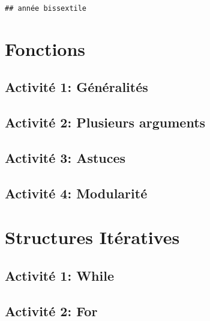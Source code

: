 \documentclass[
]{book}
\begin{document}
\begin{verbatim}
## année bissextile
\end{verbatim}

\hypertarget{fonctions}{%
\chapter{Fonctions}\label{fonctions}}

\hypertarget{activituxe9-1-guxe9nuxe9ralituxe9s}{%
\section{Activité 1: Généralités}\label{activituxe9-1-guxe9nuxe9ralituxe9s}}

\hypertarget{activituxe9-2-plusieurs-arguments}{%
\section{Activité 2: Plusieurs arguments}\label{activituxe9-2-plusieurs-arguments}}

\hypertarget{activituxe9-3-astuces}{%
\section{Activité 3: Astuces}\label{activituxe9-3-astuces}}

\hypertarget{activituxe9-4-modularituxe9}{%
\section{Activité 4: Modularité}\label{activituxe9-4-modularituxe9}}

\hypertarget{structures-ituxe9ratives}{%
\chapter{Structures Itératives}\label{structures-ituxe9ratives}}

\hypertarget{activituxe9-1-while}{%
\section{Activité 1: While}\label{activituxe9-1-while}}

\hypertarget{activituxe9-2-for}{%
\section{Activité 2: For}\label{activituxe9-2-for}}
\end{document}
